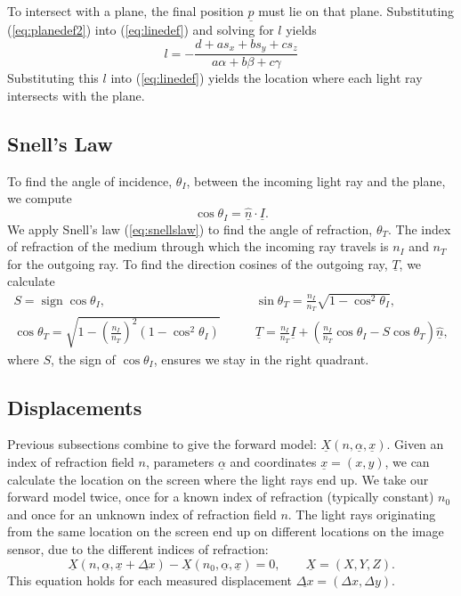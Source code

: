\documentclass{svjour3}                     %
\DeclareMathOperator{\sign}{sign}
\begin{document}
To intersect with a plane, the final position $\underline{p}$ must lie on that plane. Substituting (\ref{eq:planedef2}) into (\ref{eq:linedef}) and solving for $l$ yields 
\begin{equation}
	l = - \frac{d + a s_x + b s_y + c s_z}{a \alpha + b \beta + c \gamma}
\end{equation}
Substituting this $l$ into (\ref{eq:linedef}) yields the location where each light ray intersects with the plane.

\subsection{Snell's Law}
To find the angle of incidence, $\theta_I$, between the incoming light ray and the plane, we compute
\begin{equation}
	\cos \theta_I = \underline{\hat{n}} \cdot \underline{I}.
\end{equation}
We apply Snell's law (\ref{eq:snellslaw}) to find the angle of refraction, $\theta_T$. The index of refraction of the medium through which the incoming ray travels is $n_I$ and $n_T$ for the outgoing ray. To find the direction cosines of the outgoing ray, $\underline{T}$, we calculate 
\begin{align}
	S = \sign \cos \theta_I, &\qquad
	\sin \theta_T = \frac{n_I}{n_T} \sqrt{1-\cos^2 \theta_I}, \\
	\cos \theta_T = \sqrt{1-\left(\frac{n_I}{n_T}\right)^2(1-\cos^2 \theta_I)} &\qquad
	\underline{T} = \frac{n_I}{n_T} \underline{I} + \left(\frac{n_I}{n_T} \cos \theta_I - S \cos\theta_T\right)\underline{\hat{n}},	
\end{align}
where $S$, the sign of $\cos\theta_I$, ensures we stay in the right quadrant.

\subsection{Displacements}
\label{subsec:dis}
Previous subsections combine to give the forward model: $\underline{X}(n,\underline{\alpha}, \underline{x})$. Given an index of refraction field $n$, parameters $\underline{\alpha}$ and coordinates $\underline{x} = (x,y)$, we can calculate the location on the screen where the light rays end up. 
We take our forward model twice, once for a known index of refraction (typically constant) $n_0$ and once for an unknown index of refraction field $n$. The light rays originating from the same location on the screen end up on different locations on the image sensor, due to the different indices of refraction:
\begin{equation}
\label{eq:ForwardModel}
	 \underline{X}(n, \underline{\alpha}, \underline{x}+\underline{\Delta x}) - \underline{X}(n_0, \underline{\alpha}, \underline{x}) = 0, \qquad \underline{X} = (X, Y, Z).
\end{equation}
This equation holds for each measured displacement $\underline{\Delta x} = (\Delta x, \Delta y)$. %
\end{document}
